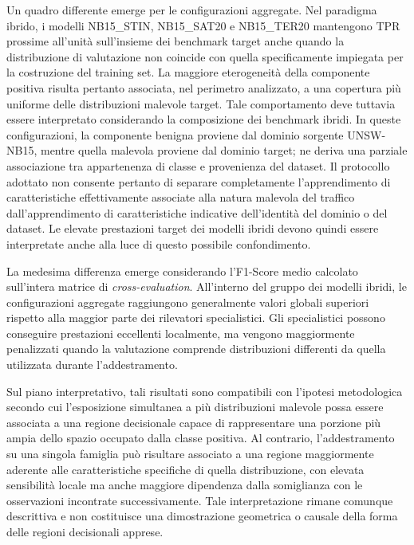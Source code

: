 Un quadro differente emerge per le configurazioni aggregate.
Nel paradigma ibrido, i modelli NB15\_STIN, NB15\_SAT20 e NB15\_TER20 mantengono TPR prossime all'unità sull'insieme dei benchmark target anche quando la distribuzione di valutazione non coincide con quella specificamente impiegata per la costruzione del training set.
La maggiore eterogeneità della componente positiva risulta pertanto associata, nel perimetro analizzato, a una copertura più uniforme delle distribuzioni malevole target.
Tale comportamento deve tuttavia essere interpretato considerando la composizione dei benchmark ibridi. In queste configurazioni, la componente benigna proviene dal dominio sorgente UNSW-NB15, mentre quella malevola proviene dal dominio target; ne deriva una parziale associazione tra appartenenza di classe e provenienza del dataset. Il protocollo adottato non consente pertanto di separare completamente l'apprendimento di caratteristiche effettivamente associate alla natura malevola del traffico dall'apprendimento di caratteristiche indicative dell'identità del dominio o del dataset. Le elevate prestazioni target dei modelli ibridi devono quindi essere interpretate anche alla luce di questo possibile confondimento.

La medesima differenza emerge considerando l'F1-Score medio calcolato sull'intera matrice di \textit{cross-evaluation}.
All'interno del gruppo dei modelli ibridi, le configurazioni aggregate raggiungono generalmente valori globali superiori rispetto alla maggior parte dei rilevatori specialistici.
Gli specialistici possono conseguire prestazioni eccellenti localmente, ma vengono maggiormente penalizzati quando la valutazione comprende distribuzioni differenti da quella utilizzata durante l'addestramento.

Sul piano interpretativo, tali risultati sono compatibili con l'ipotesi metodologica secondo cui l'esposizione simultanea a più distribuzioni malevole possa essere associata a una regione decisionale capace di rappresentare una porzione più ampia dello spazio occupato dalla classe positiva.
Al contrario, l'addestramento su una singola famiglia può risultare associato a una regione maggiormente aderente alle caratteristiche specifiche di quella distribuzione, con elevata sensibilità locale ma anche maggiore dipendenza dalla somiglianza con le osservazioni incontrate successivamente.
Tale interpretazione rimane comunque descrittiva e non costituisce una dimostrazione geometrica o causale della forma delle regioni decisionali apprese.


